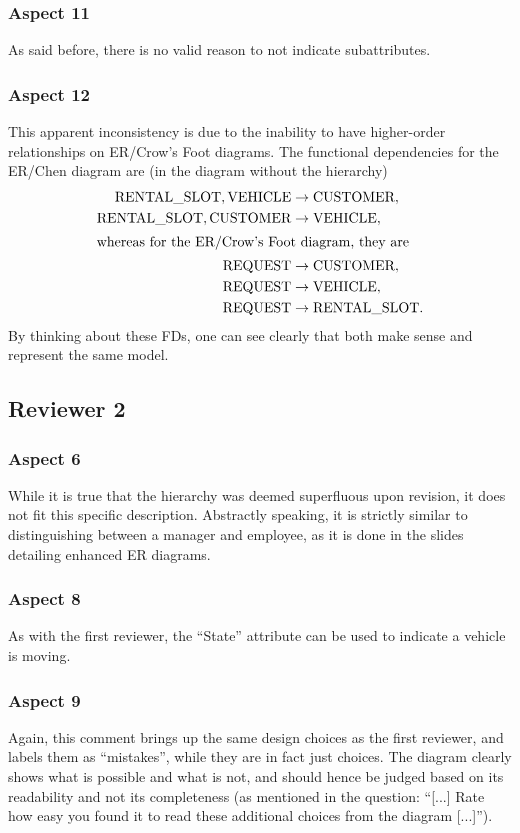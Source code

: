 \documentclass[journal, 9pt]{IEEEtran}
\theoremstyle{definition}
\begin{document}
\subsubsection{Aspect 11}
As said before, there is no valid reason to not indicate subattributes.

\subsubsection{Aspect 12}
This apparent inconsistency is due to the inability to have higher-order relationships on ER/Crow's Foot diagrams.
The functional dependencies for the ER/Chen diagram are (in the diagram without the hierarchy)
\begin{align*}
\textnormal{RENTAL\_SLOT}, \textnormal{VEHICLE} &\to \textnormal{CUSTOMER}, \\
\textnormal{RENTAL\_SLOT}, \textnormal{CUSTOMER} &\to \textnormal{VEHICLE}, \\
\intertext{whereas for the ER/Crow's Foot diagram, they are}
\textnormal{REQUEST} &\to \textnormal{CUSTOMER}, \\
\textnormal{REQUEST} &\to \textnormal{VEHICLE}, \\
\textnormal{REQUEST} &\to \textnormal{RENTAL\_SLOT}.
\end{align*}
By thinking about these FDs, one can see clearly that both make sense and represent the same model.

\subsection{Reviewer 2}
\subsubsection{Aspect 6}
While it is true that the hierarchy was deemed superfluous upon revision, it does not fit this specific description.
Abstractly speaking, it is strictly similar to distinguishing between a manager and employee, as it is done in the slides detailing enhanced ER diagrams.

\subsubsection{Aspect 8}
As with the first reviewer, the ``State'' attribute can be used to indicate a vehicle is moving.

\subsubsection{Aspect 9}
Again, this comment brings up the same design choices as the first reviewer, and labels them as ``mistakes'', while they are in fact just choices.
The diagram clearly shows what is possible and what is not, and should hence be judged based on its readability and not its completeness (as mentioned in the question: ``[...] Rate how easy you found it to read these additional choices from the diagram [...]'').
\end{document}
